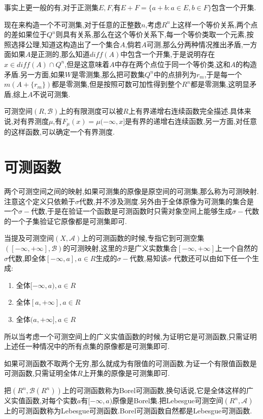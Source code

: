 事实上更一般的有,对于正测集$E,F$,有$E+F=\{a+b:a\in E,b\in F\}$包含一个开集.

现在来构造一个不可测集,对于任意的正整数$n$,考虑$R^n$上这样一个等价关系,两个点的差如果位于$Q^n$则具有关系,那么在这个等价关系下,每一个等价类取一个元素,按照选择公理,知道这构造出了一个集合$A$,倘若$A$可测,那么分两种情况推出矛盾,一方面如果$A$是正测的,那么知道$diff(A)$中包含一个开集,于是说明存在$x\in diff(A)\cap Q^n$,但是这意味着$A$中存在两个点位于同一个等价类,这和$A$的构造矛盾.另一方面,如果$W$是零测集,那么把可数集$Q^n$中的点排列为$r_m$,于是每一个$m(A+\{r_m\})$都是零测集,但是按照可数可加性得到整个$R^n$都是零测集,这明显矛盾,综上$A$不说可测集.

可测空间$(R,\mathscr{B})$上的有限测度可以被$R$上有界递增右连续函数完全描述.具体来说,对有界测度$\mu$,有$F_{\mu}(x)=\mu(-\infty,x]$是有界的递增右连续函数,另一方面,对任意的这样函数,可以确定一个有界测度.
\section{可测函数}

两个可测空间之间的映射,如果可测集的原像是原空间的可测集,那么称为可测映射.注意这个定义只依赖于$\sigma$代数,并不涉及测度.另外由于全体原像为可测集的集合是一个$\sigma-$代数,于是在验证一个函数是可测函数时只需对象空间上能够生成$\sigma-$代数的一个子集验证它原像都是可测集即可.

当提及可测空间$(X,\mathscr{A})$上的可测函数的时候,专指它到可测空集$([-\infty,+\infty],\mathscr{B})$的可测映射,这里的$\mathscr{B}$是广义实数集合$[-\infty,+\infty]$上一个自然的$\sigma$代数,即全体$[-\infty,a],a\in R$生成的$\sigma-$代数,易知该$\sigma$ 代数还可以由如下任一个生成:
\begin{enumerate}
  \item 全体$[-\infty,a),a\in R$
  \item 全体$[a,+\infty],a\in R$
  \item 全体$(a,+\infty],a\in R$
\end{enumerate}

所以当考虑一个可测空间上的广义实值函数的时候,为证明它是可测函数,只需证明上述任一种情况中的所有点集的原像都是可测集即可.

如果可测函数不取两个无穷,那么就成为有限值的可测函数.为证一个有限值函数是可测函数,只需证明全体$R$上开集的原像是可测集即可.

把$(R^n,\mathscr{B}(R^n))$上的可测函数称为Borel可测函数,换句话说,它是全体这样的广义实值函数,对每个实数$a$有$[-\infty,a)$原像是Borel集.把Lebesgue可测空间$(R^n,\mathscr{A})$上的可测函数称为Lebesgue可测函数.Borel可测函数自然都是Lebesgue可测函数.

